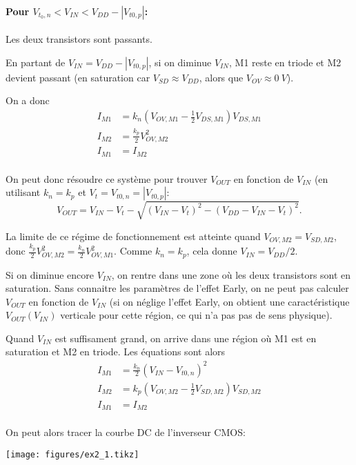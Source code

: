 \documentclass[frenchb,DIV=14]{scrartcl}
\begin{document}
\paragraph{Pour $V_{t_0,n} < V_{IN} < V_{DD} - \left|V_{t0,p}\right|$:}
Les deux transistors sont passants.

En partant de $V_{IN} = V_{DD} - \left|V_{t0,p}\right|$,
si on diminue $V_{IN}$, M1 reste en triode et M2 devient passant
(en saturation car $V_{SD} \approx V_{DD}$, alors que $V_{OV} \approx \SI{0}{V}$).

On a donc
\begin{align*}
    I_{M1} &= k_n \left(V_{OV,M1}-\frac{1}{2}V_{DS,M1}\right)V_{DS,M1} \\
    I_{M2} &= \frac{k_p}{2} V_{OV,M2}^2 \\
    I_{M1} &= I_{M2} \\
\end{align*}

On peut donc résoudre ce système pour trouver $V_{OUT}$ en fonction
de $V_{IN}$ (en utilisant $k_n = k_p$ et $V_t = V_{t0,n} = |V_{t0,p}|$:
\[V_{OUT} = V_{IN}-V_t - \sqrt{(V_{IN}-V_t)^2-(V_{DD}-V_{IN}-V_t)^2}.\]

La limite de ce régime de fonctionnement est atteinte quand
$V_{OV,M2} = V_{SD,M2}$, donc $\frac{k_p}{2}V_{OV,M2}^2 = \frac{k_n}{2}V_{OV,M1}^2$.
Comme $k_n = k_p$, cela donne $V_{IN} = V_{DD}/2$.

Si on diminue encore $V_{IN}$, on rentre dans une zone où les deux transistors sont en saturation.
Sans connaitre les paramètres de l'effet Early, on ne peut pas calculer
$V_{OUT}$ en fonction de $V_{IN}$ (si on néglige l'effet Early, on
obtient une caractéristique $V_{OUT}(V_{IN})$ verticale pour cette région,
ce qui n'a pas pas de sens physique).

Quand $V_{IN}$ est suffisament grand, on arrive dans une région où
M1 est en saturation et M2 en triode.
Les équations sont alors
\begin{align*}
    I_{M1} &= \frac{k_n}{2} (V_{IN} - V_{t0,n})^2 \\
    I_{M2} &= k_p \left(V_{OV,M2}-\frac{1}{2}V_{SD,M2}\right)V_{SD,M2} \\
    I_{M1} &= I_{M2} \\
\end{align*}

On peut alors tracer la courbe DC de l'inverseur CMOS:
\begin{center}
\texttt{[image: figures/ex2\_1.tikz]}
\end{center}
\end{document}
